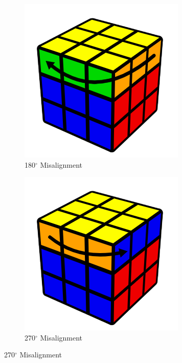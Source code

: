 \begin{figure}[h]
\begin{subfigure}{0.25\textwidth}
    \end{subfigure}%
    \begin{subfigure}{0.25\textwidth}
        \centering
        \caption{180$^\circ$ Misalignment}
        \label{fig:rotation-misaligned-180}
        \includegraphics[width=.90\linewidth]{Figures/4 Protocol Design/Specification/180_misaligned.png}
    \end{subfigure}%
    \begin{subfigure}{0.25\textwidth}
        \centering
        \caption{270$^\circ$ Misalignment}
        \label{fig:rotation-misaligned-270}
        \includegraphics[width=.90\linewidth]{Figures/4 Protocol Design/Specification/270_misaligned.png}
    \end{subfigure}%
\end{figure}

